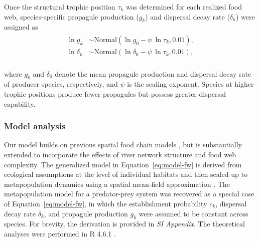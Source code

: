 \documentclass[9pt,twocolumn,twoside]{pnas-new}
\begin{document}
Once the structural trophic position $\tau_k$ was determined for each realized food web, species-specific propagule production ($g_k$) and dispersal decay rate ($\delta_k$) were assigned as
\\
\begin{align}
\begin{split}
    \ln g_k &\sim \mathrm{Normal}(\ln g_0 - \psi\, \ln \tau_k, 0.01),\\
    \ln \delta_k &\sim \mathrm{Normal}(\ln \delta_0 - \psi\,\ln \tau_k, 0.01),
\end{split}
\end{align}
\\
where $g_0$ and $\delta_0$ denote the mean propagule production and dispersal decay rate of producer species, respectively, and $\psi$ is the scaling exponent.
Species at higher trophic positions produce fewer propagules but possess greater dispersal capability.

\subsubsection*{Model analysis}

Our model builds on previous spatial food chain models \citep[e.g.,][]{holt_food_2002, takimoto_effects_2012, calcagno_constraints_2011, terui_spatial_2019}, but is substantially extended to incorporate the effects of river network structure and food web complexity. 
The generalized model in Equation~\ref{eq:model-fw} is derived from ecological assumptions at the level of individual habitats and then scaled up to metapopulation dynamics using a spatial mean-field approximation \citep{ovaskainen_asymptotically_2006}. 
The metapopulation model for a predator-prey system was recovered as a special case of Equation~\ref{eq:model-fw}, in which the establishment probability $c_k$, dispersal decay rate $\delta_k$, and propagule production $g_k$ were assumed to be constant across species.
For brevity, the derivation is provided in \textit{SI Appendix}.
The theoretical analyses were performed in R 4.6.1 \citep{r_program}.
\end{document}

